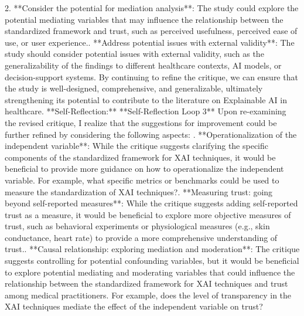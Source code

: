 \documentclass{article}%
\begin{document}
2. **Consider the potential for mediation analysis**: The study could explore the potential mediating variables that may influence the relationship between the standardized framework and trust, such as perceived usefulness, perceived ease of use, or user experience.. **Address potential issues with external validity**: The study should consider potential issues with external validity, such as the generalizability of the findings to different healthcare contexts, AI models, or decision{-}support systems.\newline%
\newline%
By continuing to refine the critique, we can ensure that the study is well{-}designed, comprehensive, and generalizable, ultimately strengthening its potential to contribute to the literature on Explainable AI in healthcare.\newline%
\newline%
**Self{-}Reflection:**\newline%
**Self{-}Reflection Loop 3**\newline%
\newline%
Upon re{-}examining the revised critique, I realize that the suggestions for improvement could be further refined by considering the following aspects:\newline%
. **Operationalization of the independent variable**: While the critique suggests clarifying the specific components of the standardized framework for XAI techniques, it would be beneficial to provide more guidance on how to operationalize the independent variable. For example, what specific metrics or benchmarks could be used to measure the standardization of XAI techniques?. **Measuring trust: going beyond self{-}reported measures**: While the critique suggests adding self{-}reported trust as a measure, it would be beneficial to explore more objective measures of trust, such as behavioral experiments or physiological measures (e.g., skin conductance, heart rate) to provide a more comprehensive understanding of trust.. **Causal relationship: exploring mediation and moderation**: The critique suggests controlling for potential confounding variables, but it would be beneficial to explore potential mediating and moderating variables that could influence the relationship between the standardized framework for XAI techniques and trust among medical practitioners. For example, does the level of transparency in the XAI techniques mediate the effect of the independent variable on trust?\newline%
\end{document}
